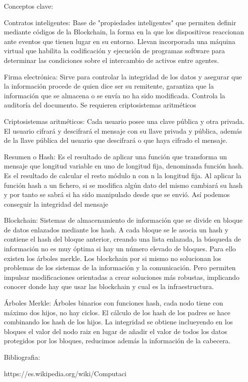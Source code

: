 Conceptos clave:

Contratos inteligentes: Base de "propiedades inteligentes" que permiten definir mediante códigos de la Blockchain, la forma en la que los dispositivos reaccionan ante eventos que tienen lugar en su entorno. Llevan incorporada una máquina virtual que habilita la codificación y ejecución de programas software para determinar las condiciones sobre el intercambio de activos entre agentes.

Firma electrónica: Sirve para controlar la integridad de los datos y asegurar que la información procede de quien dice ser su remitente, garantiza que la información que se almacena o se envía no ha sido modificada. Controla la auditoría del documento. Se requieren criptosistemas aritméticos

Criptosistemas aritméticos: Cada usuario posee una clave pública y otra privada. El usuario cifrará y descifrará el mensaje con su llave privada y pública, además de la llave pública del usuario que descifrará o que haya cifrado el mensaje.


Resumen o Hash: Es el resultado de aplicar una función que transforma un mensaje que longitud variable en uno de longitud fija, denominada función hash. Es el resultado de calcular el resto módulo n con n la longitud fija. Al aplicar la función hash a un fichero, si se modifica algún dato del mismo cambiará su hash y por tanto se sabrá si ha sido manipulado desde que se envió. Así podemos conseguir la integridad del mensaje

Blockchain: Sistemas de almacenamiento de información que se divide en bloque de datos enlazados mediante los hash. A cada bloque se le asocia un hash y contiene el hash del bloque anterior, creando una lista enlazada, la búsqueda de información no es muy óptima si hay un número elevado de bloques. Para ello existen los árboles merkle.
Los blockchain por si mismo no solucionan los problemas de los sistemas de la información y la comunicación. Pero permiten impulsar modificaciones orientadas a crear soluciones más robustas, implicando conocer donde hay que usar las blockchain y cual es la infraestructura.


Árboles Merkle: Árboles binarios con funciones hash, cada nodo tiene con máximo dos hijos, no hay ciclos. El cálculo de los hash de los padres se hace combinando los hash de los hijos. La integridad se obtiene inclueyendo en los bloques el valor del nodo raiz en lugar de añadir el valor de todos los datos protegidos por los bloques, reducimos además la información de la cabecera.




Bibliografia:

https://es.wikipedia.org/wiki/Computaci%
